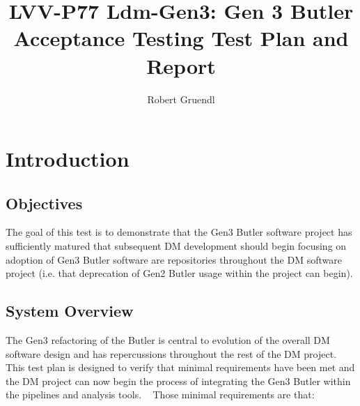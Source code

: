 \documentclass[DM,lsstdraft,STR,toc]{lsstdoc}
\begin{document}
\def\milestoneName{Ldm-Gen3: Gen 3 Butler Acceptance Testing}
\def\milestoneId{LVV-P77}
\def\product{Software Products}


\title{ LVV-P77 Ldm-Gen3: Gen 3 Butler Acceptance Testing Test Plan and Report}
\setDocRef{\lsstDocType-\lsstDocNum}
\date{\vcsdate}
\author{ Robert Gruendl }






\maketitle

\section{Introduction}
\label{sect:intro}


\subsection{Objectives}
\label{sect:objectives}

 The goal of this test is to demonstrate that the Gen3 Butler software
project has sufficiently matured that subsequent DM development should
begin focusing on adoption of Gen3 Butler software are repositories
throughout the DM software project (i.e. that deprecation of Gen2 Butler
usage within the project can begin).



\subsection{System Overview}
\label{sect:systemoverview}

 The Gen3 refactoring of the Butler is central to evolution of the
overall DM software design and has repercussions throughout the rest of
the DM project. ~ This test plan is designed to verify that minimal
requirements have been met and the DM project can now begin the process
of integrating the Gen3 Butler within the pipelines and analysis tools.
~ Those minimal requirements are that:
\end{document}
